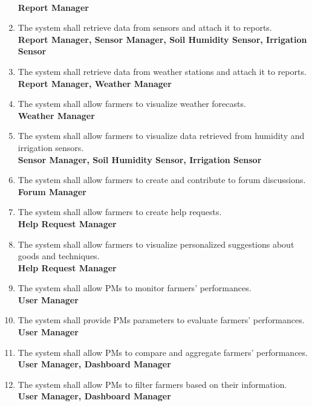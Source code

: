 \documentclass[10pt]{article} %
\begin{document}
\begin{enumerate}[label=\textbf{R\arabic*}]
    \\\textbf{Report Manager} 
    \item \label{req:farmerReport4} The system shall retrieve data from sensors and attach it to reports.     
    \\\textbf{Report Manager, Sensor Manager, Soil Humidity Sensor, Irrigation Sensor} 
    \item \label{req:farmerReport5} The system shall retrieve data from weather stations and attach it to reports.     
    \\\textbf{Report Manager, Weather Manager} 
    \item \label{req:farmerWeather} The system shall allow farmers to visualize weather forecasts.
    \\\textbf{Weather Manager} 
    \item \label{req:farmerSensors} The system shall allow farmers to visualize data retrieved from humidity and irrigation sensors.
    \\\textbf{Sensor Manager, Soil Humidity Sensor, Irrigation Sensor} 
    \item \label{req:farmerForum} The system shall allow farmers to create and contribute to forum discussions.    
    \\\textbf{Forum Manager} 
    \item \label{req:farmerHelp} The system shall allow farmers to create help requests.     
    \\\textbf{Help Request Manager} 
    \item \label{req:farmerSugg} The system shall allow farmers to visualize personalized suggestions about goods and techniques.    
    \\\textbf{Help Request Manager} 
    \item \label{req:pmMonitor} The system shall allow PMs to monitor farmers' performances.    
    \\\textbf{User Manager} 
    \item \label{req:pmParameters} The system shall provide PMs parameters to evaluate farmers' performances.   
    \\\textbf{User Manager} 
    \item \label{req:pmGrades} The system shall allow PMs to compare and aggregate farmers' performances.    
    \\\textbf{User Manager, Dashboard Manager} 
    \item \label{req:pmFilter1} The system shall allow PMs to filter farmers based on their information.    
    \\\textbf{User Manager, Dashboard Manager} 

\end{enumerate}
\end{document}
